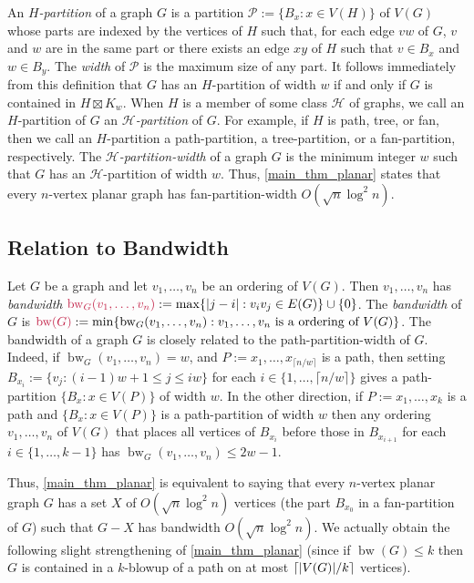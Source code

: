 \documentclass{patmorin}
\makeatletter
\renewcommand{\le}{\leqslant}
\renewcommand{\leq}{\leqslant}
\newcommand{\david}[1]{{\color{orange} David: #1}}
\newcommand{\defin}[1]{\emph{\textcolor{brightmaroon}{#1}}}
\def\mathcolor#1#{\@mathcolor{#1}}
\def\@mathcolor#1#2#3{%
  \protect\leavevmode
  \begingroup
    \color#1{#2}#3%
  \endgroup
}
\newcommand{\mathdefin}[1]{\mathcolor{brightmaroon}{#1}}
\DeclareMathOperator{\bw}{bw}
\makeatother
\begin{document}
An \defin{$H$-partition} of a graph $G$ is a partition $\mathcal{P}:=\{B_x: x\in V(H)\}$ of $V(G)$ whose parts are indexed by the vertices of $H$ such that, for each edge $vw$ of $G$, $v$ and $w$ are in the same part or there exists an edge $xy$ of $H$ such that $v\in B_x$ and $w\in B_y$.  The \defin{width} of $\mathcal{P}$ is the maximum size of any part.  It follows immediately from this definition that $G$ has an $H$-partition of width $w$ if and only if $G$ is contained in $H\boxtimes K_w$. When $H$ is a member of some class $\mathcal{H}$ of graphs, we call an $H$-partition of $G$ an \defin{$\mathcal{H}$-partition} of $G$.  For example, if $H$ is path, tree, or fan, then we call an $H$-partition a path-partition, a tree-partition, or a fan-partition, respectively.  The \defin{$\mathcal{H}$-partition-width}  of a graph $G$ is the minimum integer $w$ such that $G$ has an $\mathcal{H}$-partition of width $w$. Thus, \cref{main_thm_planar} states that every $n$-vertex planar graph has fan-partition-width $O(\sqrt{n}\log^2 n)$.


\subsection{Relation to Bandwidth}

Let $G$ be a graph and let $v_1,\ldots,v_n$ be an ordering of $V(G)$.
Then $v_1,\ldots,v_n$ has \defin{bandwidth} $\mathdefin{\bw_G(v_1,\ldots,v_n)}:=\max\{|j-i|: v_iv_j\in E(G)\}\cup\{0\}$.
The \defin{bandwidth} of $G$ is $\mathdefin{\bw(G)}:=\min\{\bw_G(v_1,\ldots,v_n):\text{$v_1,\ldots,v_n$ is a ordering of $V(G)$}\}$. The bandwidth of a graph $G$ is closely related to the path-partition-width of $G$.  Indeed, if $\bw_G(v_1,\ldots,v_n)=w$, and $P:=x_1,\ldots,x_{\lceil n/w\rceil}$ is a path, then setting $B_{x_i}:=\{v_j: (i-1)w+1 \le j \le iw\}$ for each $i\in\{1,\ldots,\lceil n/w\rceil\}$ gives a path-partition $\{B_{x}:x\in V(P)\}$ of width $w$.  In the other direction, if $P:=x_1,\ldots,x_k$ is a path and  $\{B_x:x\in V(P)\}$ is a path-partition of width $w$ then any ordering $v_1,\ldots,v_n$ of $V(G)$ that places all vertices of $B_{x_i}$ before those in $B_{x_{i+1}}$ for each $i\in\{1,\ldots,k-1\}$ has $\bw_G(v_1,\ldots,v_n)\le 2w-1$.

Thus, \cref{main_thm_planar} is equivalent to saying that every $n$-vertex planar graph $G$ has a set $X$ of  $O(\sqrt{n}\log^2 n)$ vertices (the part $B_{x_0}$ in a fan-partition of $G$) such that $G-X$ has bandwidth $O(\sqrt{n}\log^2 n)$. We actually obtain the following slight strengthening of \cref{main_thm_planar} (since if $\bw(G)\leq k$ then $G$ is contained in a $k$-blowup of a path on at most ${\lceil |V(G)|/k \rceil}$ vertices).
\end{document}
